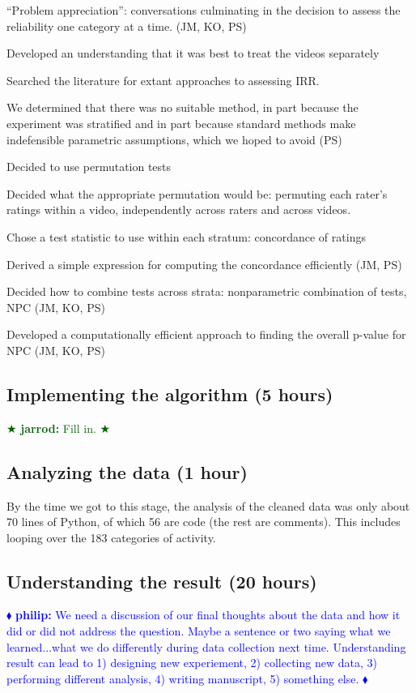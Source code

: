 \documentclass[]{article}
\newcommand{\philip}[1] { \textcolor{blue} {
\ensuremath{\blacklozenge} {\bf philip:}  {#1}
\ensuremath{\blacklozenge} } }
\newcommand{\jarrod}[1] { \textcolor{darkgreen} {
\ensuremath{\bigstar} {\bf jarrod:}  {#1}
\ensuremath{\bigstar} } }
\begin{document}
``Problem appreciation'': conversations culminating in the decision to assess
the reliability one category at a time. (JM, KO, PS)

Developed an understanding that it was best to treat the videos separately

Searched the literature for extant approaches to assessing IRR.

We determined that there was no suitable method, in part because the experiment
was stratified and in part because standard methods make indefensible
parametric assumptions, which we hoped to avoid (PS)

Decided to use permutation tests

Decided what the appropriate permutation would be: permuting each rater's
ratings within a video, independently across raters and across videos.

Chose a test statistic to use within each stratum: concordance of ratings

Derived a simple expression for computing the concordance efficiently (JM, PS)

Decided how to combine tests across strata: nonparametric combination of tests,
NPC (JM, KO, PS)

Developed a computationally efficient approach to finding the overall p-value
for NPC (JM, KO, PS)

\subsection{Implementing the algorithm (5 hours)}

\jarrod{Fill in.}
  
\subsection{Analyzing the data (1 hour)}

By the time we got to this stage, the analysis of the cleaned data was only
about 70 lines of Python, of which 56 are code (the rest are comments).
This includes looping over the 183 categories of activity.

\subsection{Understanding the result (20 hours)}

\philip{We need a discussion of our final thoughts about the data
and how it did or did not address the question.  Maybe a sentence
or two saying what we learned...what we do differently during
data collection next time.
Understanding result can lead to
1) designing new experiement,
2) collecting new data,
3) performing different analysis,
4) writing manuscript,
5) something else. 
}
\end{document}
